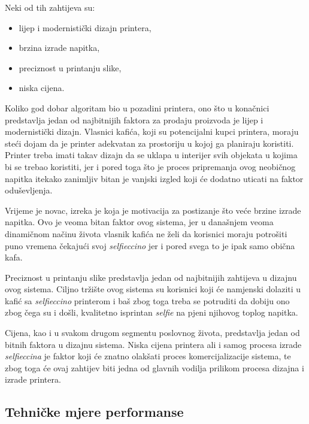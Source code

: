 \documentclass[12pt]{article}
\begin{document}
Neki od tih zahtijeva su:
\begin{itemize}
\item lijep i modernisti\v{c}ki dizajn printera,
\item brzina izrade napitka,
\item preciznost u printanju slike,
\item niska cijena.
\end{itemize}

Koliko god dobar algoritam bio u pozadini printera, ono \v{s}to u kona\v{c}nici predstavlja jedan od najbitnijih faktora za prodaju proizvoda je lijep i modernisti\v{c}ki dizajn. Vlasnici kafi\'ca, koji su potencijalni kupci printera, moraju ste\'ci dojam da je printer adekvatan za prostoriju u kojoj ga planiraju koristiti. Printer treba imati takav dizajn da se uklapa u interijer svih objekata u kojima bi se trebao koristiti, jer i pored toga \v{s}to je proces pripremanja ovog neobi\v{c}nog napitka itekako zanimljiv bitan je vanjski izgled koji \'ce dodatno uticati na faktor odu\v{s}evljenja.

\newpage

Vrijeme je novac, izreka je koja je motivacija za postizanje \v{s}to ve\'ce brzine izrade napitka. Ovo je veoma bitan faktor ovog sistema, jer u dana\v{s}njem veoma dinami\v{c}nom na\v{c}inu \v{z}ivota vlasnik kafi\'ca ne \v{z}eli da korisnici moraju potro\v{s}iti puno vremena \v{c}ekaju\'ci svoj \textit{selfieccino} jer i pored svega to je ipak samo obi\v{c}na kafa.

Preciznost u printanju slike predstavlja jedan od najbitnijih zahtijeva u dizajnu ovog sistema. Ciljno tr\v{z}i\v{s}te ovog sistema su korisnici koji \'ce namjenski dolaziti u kafi\'c sa \textit{selfieccino} printerom i ba\v{s} zbog toga treba se potruditi da dobiju ono zbog \v{c}ega su i do\v{s}li, kvalitetno isprintan \textit{selfie} na pjeni njihovog toplog napitka.

Cijena, kao i u svakom drugom segmentu poslovnog \v{z}ivota, predstavlja jedan od bitnih faktora u dizajnu sistema. Niska cijena printera  ali i samog procesa izrade \textit{selfieccina} je faktor koji \'ce znatno olak\v{s}ati proces komercijalizacije sistema, te zbog toga \'ce ovaj zahtijev biti jedna od glavnih vodilja prilikom procesa dizajna i izrade printera.
 
\subsection{Tehni\v{c}ke mjere performanse} 
\end{document}
